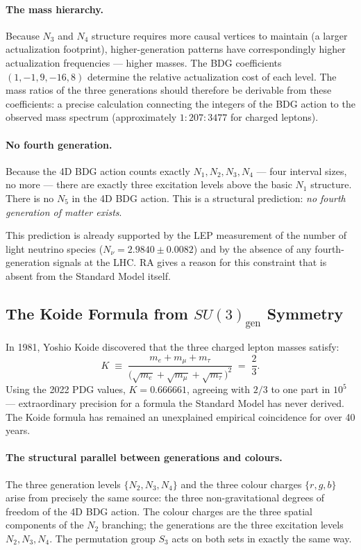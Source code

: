\documentclass[11pt,a4paper]{article}
\begin{document}
\paragraph{The mass hierarchy.}
Because $N_3$ and $N_4$ structure requires more causal vertices to maintain
(a larger actualization footprint), higher-generation patterns have
correspondingly higher actualization frequencies --- higher masses. The BDG
coefficients $(1, -1, 9, -16, 8)$ determine the relative actualization cost
of each level. The mass ratios of the three generations should therefore
be derivable from these coefficients: a precise calculation connecting the
integers of the BDG action to the observed mass spectrum
(approximately $1 : 207 : 3477$ for charged leptons).

\paragraph{No fourth generation.}
Because the 4D BDG action counts exactly $N_1, N_2, N_3, N_4$ --- four interval
sizes, no more --- there are exactly three excitation levels above the basic
$N_1$ structure. There is no $N_5$ in the 4D BDG action. This is a structural
prediction: \emph{no fourth generation of matter exists}.

This prediction is already supported by the LEP measurement of the number of
light neutrino species ($N_\nu = 2.9840 \pm 0.0082$) and by the absence of
any fourth-generation signals at the LHC. RA gives a reason for this
constraint that is absent from the Standard Model itself.

\subsection{The Koide Formula from $SU(3)_{\mathrm{gen}}$ Symmetry}
\label{sec:koide}

In 1981, Yoshio Koide discovered that the three charged lepton masses satisfy:
\begin{equation}
  K \;\equiv\; \frac{m_e + m_\mu + m_\tau}{\bigl(\sqrt{m_e} + \sqrt{m_\mu}
  + \sqrt{m_\tau}\bigr)^2} \;=\; \frac{2}{3}.
  \label{eq:koide}
\end{equation}
Using the 2022 PDG values, $K = 0.666661$, agreeing with $2/3$ to one part
in $10^5$ --- extraordinary precision for a formula the Standard Model has
never derived. The Koide formula has remained an unexplained empirical
coincidence for over 40 years.

\paragraph{The structural parallel between generations and colours.}
The three generation levels $\{N_2, N_3, N_4\}$ and the three colour charges
$\{r, g, b\}$ arise from precisely the same source: the three non-gravitational
degrees of freedom of the 4D BDG action. The colour charges are the three
spatial components of the $N_2$ branching; the generations are the three
excitation levels $N_2, N_3, N_4$. The permutation group $S_3$ acts
on both sets in exactly the same way.
\end{document}
